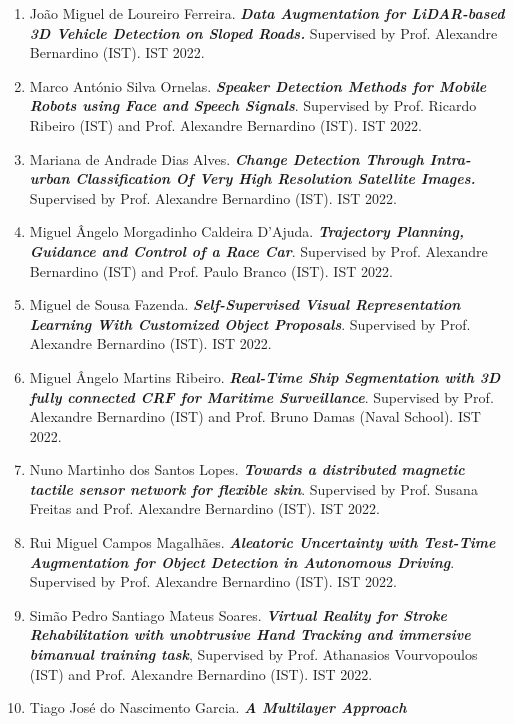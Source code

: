 \documentclass[
]{article}
\begin{document}
\begin{enumerate}
  Inês Gaspar Coelho. \emph{\textbf{Improving image stitching methods
  for mapping low texture wind turbine blades.}} Supervised by Prof.
  Alexandre Bernardino (IST). IST 2022.
\item
  João Miguel de Loureiro Ferreira. \emph{\textbf{Data Augmentation for
  LiDAR-based 3D Vehicle Detection on Sloped Roads.}} Supervised by
  Prof. Alexandre Bernardino (IST). IST 2022.
\item
  Marco António Silva Ornelas. \emph{\textbf{Speaker Detection Methods
  for Mobile Robots using Face and Speech Signals}}. Supervised by Prof.
  Ricardo Ribeiro (IST) and Prof. Alexandre Bernardino (IST). IST 2022.
\item
  Mariana de Andrade Dias Alves. \emph{\textbf{Change Detection Through
  Intra-urban Classification Of Very High Resolution Satellite Images.}}
  Supervised by Prof. Alexandre Bernardino (IST). IST 2022.
\item
  Miguel Ângelo Morgadinho Caldeira D'Ajuda. \emph{\textbf{Trajectory
  Planning, Guidance and Control of a Race Car}}. Supervised by Prof.
  Alexandre Bernardino (IST) and Prof. Paulo Branco (IST). IST 2022.
\item
  Miguel de Sousa Fazenda. \emph{\textbf{Self-Supervised Visual
  Representation Learning With Customized Object Proposals}}. Supervised
  by Prof. Alexandre Bernardino (IST). IST 2022.
\item
  Miguel Ângelo Martins Ribeiro. \emph{\textbf{Real-Time Ship
  Segmentation with 3D fully connected CRF for Maritime Surveillance}}.
  Supervised by Prof. Alexandre Bernardino (IST) and Prof. Bruno Damas
  (Naval School). IST 2022.
\item
  Nuno Martinho dos Santos Lopes. \emph{\textbf{Towards a distributed
  magnetic tactile sensor network for flexible skin}}. Supervised by
  Prof. Susana Freitas and Prof. Alexandre Bernardino (IST). IST 2022.
\item
  Rui Miguel Campos Magalhães. \emph{\textbf{Aleatoric Uncertainty with
  Test-Time Augmentation for Object Detection in Autonomous Driving}}.
  Supervised by Prof. Alexandre Bernardino (IST). IST 2022.
\item
  Simão Pedro Santiago Mateus Soares. \emph{\textbf{Virtual Reality for
  Stroke Rehabilitation with unobtrusive Hand Tracking and immersive
  bimanual training task}}, Supervised by Prof. Athanasios Vourvopoulos
  (IST) and Prof. Alexandre Bernardino (IST). IST 2022.
\item
  Tiago José do Nascimento Garcia. \emph{\textbf{A Multilayer Approach
}}
\end{enumerate}
\end{document}
